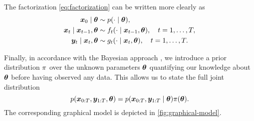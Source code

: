 The factorization \eqref{eq:factorization} can be written more clearly as
\begin{align*}
\bm{x}_0 \mid \bm{\theta} & \sim p(\cdot \mid \bm{\theta}), \\
\bm{x}_t \mid \bm{x}_{t-1}, \bm{\theta} & \sim f_t(\cdot \mid \bm{x}_{t-1}, \bm{\theta}), \quad t = 1, \ldots, T, \\
\bm{y}_t \mid \bm{x}_t, \bm{\theta} & \sim g_t(\cdot \mid \bm{x}_t, \bm{\theta}), \quad t = 1, \ldots, T.
\end{align*}

Finally, in accordance with the Bayesian approach \citep{bayes}, we introduce a prior distribution $\pi$ over the unknown parameters $\bm{\theta}$ quantifying our knowledge about $\bm{\theta}$ before having observed any data. This allows us to state the full joint distribution
\begin{equation}\label{eq:full-joint}
p(\bm{x}_{0:T}, \bm{y}_{1:T}, \bm{\theta}) = p(\bm{x}_{0:T}, \bm{y}_{1:T} \mid \bm{\theta}) \pi(\bm{\theta}).
\end{equation}
The corresponding graphical model is depicted in \autoref{fig:graphical-model}.
